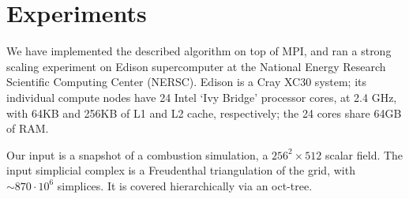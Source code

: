 
\section{Experiments}
\label{sec:experiments}

We have implemented the described algorithm on top of MPI, and ran a strong
scaling experiment on Edison supercomputer at the National Energy Research
Scientific Computing Center (NERSC). Edison is a Cray XC30 system; its
individual compute nodes have 24 Intel `Ivy Bridge' processor cores, at 2.4 GHz,
with 64KB and 256KB of L1 and L2 cache, respectively; the 24 cores share 64GB of RAM.

Our input is a snapshot of a combustion simulation, a $256^2 \times 512$ scalar
field.
The input
simplicial complex is a Freudenthal triangulation of the grid,
with $\sim 870 \cdot 10^6$ simplices. It is covered hierarchically via an
oct-tree.

